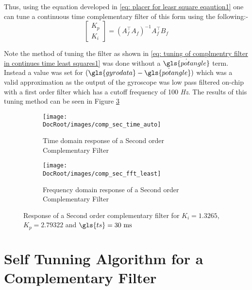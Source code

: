 Thus, using the equation developed in \eqref{eq: placer for leasr square eqaution1} one can tune a continuous time complementary filter of this form using the following:- 
\begin{equation}
	\left[\begin{array}{c} K_p\\ K_i\end{array}\right] = (A_f^\intercal A_f)^{-1}A_f^\intercal B_f \label{eq: tuning of complmentry filter in continues time least squares1}
\end{equation}

Note the method of tuning the filter as shown in \eqref{eq: tuning of complmentry filter in continues time least squares1} was done without a $\dot{\gls{potangle}}$ term. Instead a value was set for $(\gls{gyrodata} - \dot{\gls{potangle})}$ which was a valid approximation as the output of the gyroscope was low pass filtered on-chip with a first order filter which has a cutoff frequency of 100 \textit{Hz}. The results of this tuning method can be seen in Figure \ref{fig sec order comp time and freq responce least}


\begin{figure}[h]
	\centering
	\begin{subfigure}{0.32\textwidth}
		\texttt{[image: \\DocRoot/images/comp\_sec\_time\_auto]}
		\caption{Time domain response of a Second order Complementary Filter}
		\label{fg: Time domain comparison responce of the sec order comp filter least}
	\end{subfigure}%
	\hspace{3cm}
	\begin{subfigure}{0.32\textwidth}
		\texttt{[image: \\DocRoot/images/comp\_sec\_fft\_least]}
		\caption{Frequency domain response of a Second order Complementary Filter}
		\label{fg: Frequency domain responce of the sec order comp filter least}
	\end{subfigure}
	
	\caption{Response of a Second order complementary filter for $K_i = 1.3265$, $K_p = 2.79322$ and ${\gls{ts}} = 30~\mathrm{ms}$ }
	\label{fig sec order comp time and freq responce least}
\end{figure}

\section{Self Tunning Algorithm for a Complementary Filter}

